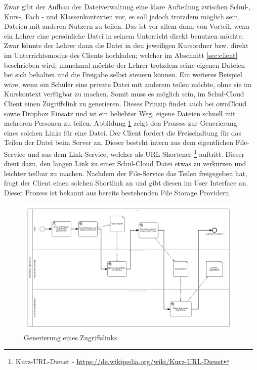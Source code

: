 Zwar gibt der Aufbau der Dateiverwaltung eine klare Aufteilung zwischen Schul-, Kurs-, Fach - und Klassenkontexten vor, es soll jedoch trotzdem möglich sein, Dateien mit anderen Nutzern zu teilen. Das ist vor allem dann von Vorteil, wenn ein Lehrer eine persönliche Datei in seinem Unterricht direkt benutzen möchte. Zwar könnte der Lehrer dann die Datei in den jeweiligen Kursordner bzw. direkt im Unterrichtsmodus des Clients hochladen; welcher im Abschnitt \ref{sec:client} beschrieben wird; manchmal möchte der Lehrer trotzdem seine eigenen Dateien bei sich behalten und die Freigabe selbst steuern können. Ein weiteres Beispiel wäre, wenn ein Schüler eine private Datei mit anderem teilen möchte, ohne sie im Kurskontext verfügbar zu machen. Somit muss es möglich sein, im Schul-Cloud Client einen Zugriffslink zu generieren. Dieses Prinzip findet auch bei ownCloud sowie Dropbox Einsatz und ist ein beliebter Weg, eigene Dateien schnell mit mehreren Personen zu  teilen. Abbildung \ref{fig:filesharinggeneration} zeigt den Prozess zur Generierung eines solchen Links für eine Datei. Der Client fordert die Freischaltung für das Teilen der Datei beim Server an. Dieser besteht intern aus dem eigentlichen File-Service und aus dem Link-Service, welcher als URL  Shortener \footnote{Kurz-URL-Dienst - \url{https://de.wikipedia.org/wiki/Kurz-URL-Dienst}} auftritt. Dieser dient dazu, den langen Link zu einer Schul-Cloud Datei etwas zu verkürzen und leichter teilbar zu machen. Nachdem der File-Service das Teilen freigegeben hat, fragt der Client einen solchen Shortlink an und gibt diesen im User Interface an. Dieser Prozess ist bekannt aus bereits bestehenden File Storage Providern.

\begin{figure}[H]
	\includegraphics[width=1\linewidth]{images/filesharinggeneration}
	\caption[Caption for concept]{Generierung eines Zugriffslinks}
	\centering
	\label{fig:filesharinggeneration}
\end{figure}

